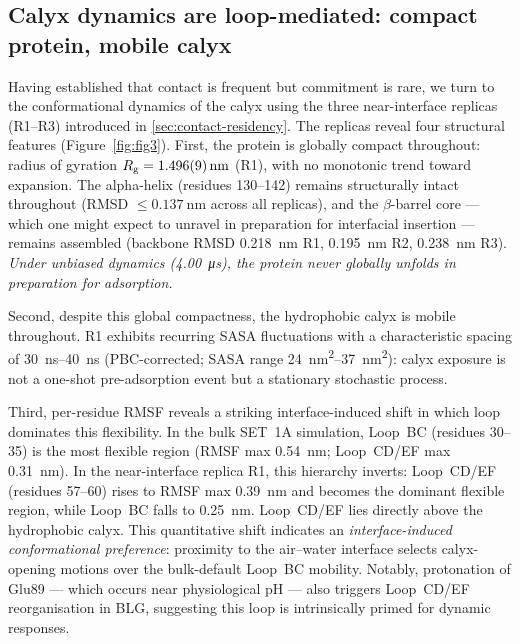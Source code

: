 \documentclass[11pt,a4paper]{article}
\begin{document}
\subsection{Calyx dynamics are loop-mediated: compact protein, mobile calyx}
\label{sec:activation}

Having established that contact is frequent but commitment is rare, we
turn to the conformational dynamics of the calyx using the three
near-interface replicas (R1--R3) introduced in \cref{sec:contact-residency}.
The replicas reveal four structural features (Figure~\ref{fig:fig3}). First,
the protein is globally compact throughout: radius of gyration
$R_\mathrm{g} = \SI{1.496 \pm 0.009}{\nano\metre}$ (R1), with no monotonic
trend toward expansion. The alpha-helix (residues 130--142) remains
structurally intact throughout (RMSD $\leq \SI{0.137}{\nano\metre}$ across
all replicas), and the $\beta$-barrel core --- which one might expect to
unravel in preparation for interfacial insertion --- remains assembled
(backbone RMSD \SI{0.218}{\nano\metre} R1, \SI{0.195}{\nano\metre} R2,
\SI{0.238}{\nano\metre} R3). \emph{Under unbiased dynamics (\SI{4.00}{\micro\second}), the protein
never globally unfolds in preparation for adsorption.}

Second, despite this global compactness, the hydrophobic calyx is mobile
throughout. R1 exhibits recurring SASA fluctuations with a characteristic
spacing of \SIrange{30}{40}{\nano\second} (PBC-corrected; SASA range
\SIrange{24}{37}{\nano\metre\squared}): calyx exposure is not a one-shot
pre-adsorption event but a stationary stochastic process.

Third, per-residue RMSF reveals a striking interface-induced shift in which
loop dominates this flexibility. In the bulk SET~1A simulation, Loop~BC
(residues 30--35) is the most flexible region (RMSF max \SI{0.54}{\nano\metre};
Loop~CD/EF max \SI{0.31}{\nano\metre}).
In the near-interface replica R1, this hierarchy inverts: Loop~CD/EF
(residues 57--60) rises to RMSF max \SI{0.39}{\nano\metre} and becomes
the dominant flexible region, while Loop~BC falls to \SI{0.25}{\nano\metre}.
Loop~CD/EF lies directly above the hydrophobic calyx. This quantitative shift indicates an
\emph{interface-induced conformational preference}: proximity to the air--water
interface selects calyx-opening motions over the bulk-default Loop~BC mobility.
Notably, protonation of Glu89 --- which occurs near physiological pH --- also
triggers Loop~CD/EF reorganisation in BLG\citep{Eberini2004}, suggesting
this loop is intrinsically primed for dynamic responses.
\end{document}
